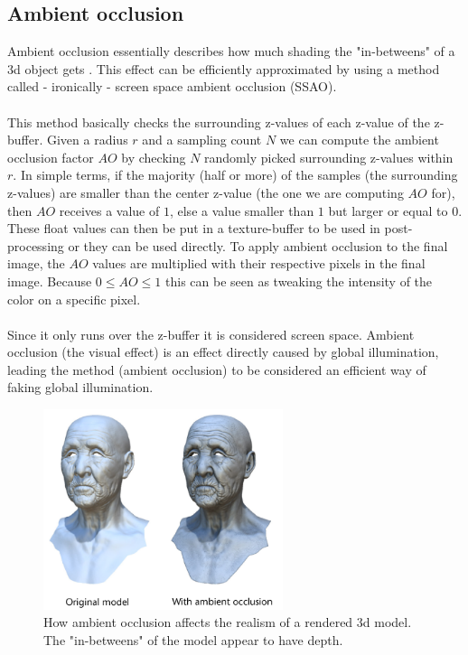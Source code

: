 \documentclass{ACGSeminar}
\begin{document}
	\subsection{Ambient occlusion}
		Ambient occlusion essentially describes how much shading the "in-betweens" of a 3d object gets \cite{AOM}. This effect can be efficiently approximated by using a method called - ironically - screen space ambient occlusion (SSAO). \\\\
		This method basically checks the surrounding z-values of each z-value of the z-buffer. Given a radius $r$ and a sampling count $N$ we can compute the ambient occlusion factor $AO$ by checking $N$ randomly picked surrounding z-values within $r$. In simple terms, if the majority (half or more) of the samples (the surrounding z-values) are smaller than the center z-value (the one we are computing $AO$ for), then $AO$ receives a value of $1$, else a value smaller than $1$ but larger or equal to $0$. These float values can then be put in a texture-buffer to be used in post-processing or they can be used directly. To apply ambient occlusion to the final image, the $AO$ values are multiplied with their respective pixels in the final image. Because $0 \leq AO \leq 1$ this can be seen as tweaking the intensity of the color on a specific pixel. \\\\
		Since it only runs over the z-buffer it is considered screen space. Ambient occlusion (the visual effect) is an effect directly caused by global illumination, leading the method (ambient occlusion) to be considered an efficient way of faking global illumination.
		\begin{figure}[htb!]%
			\begin{center}%
				\includegraphics[width=7cm]{img/ambient_occlusion.png}
			\end{center}%
			\caption{How ambient occlusion affects the realism of a rendered 3d model. The "in-betweens" of the model appear to have depth.}%
			\label{fig:ambient_occlusion}%
		\end{figure}%
\end{document}
